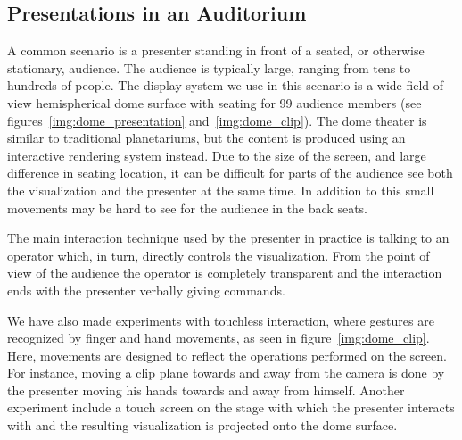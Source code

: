 \documentclass[review,journal]{vgtc}         %
\begin{document}
\subsection{Presentations in an Auditorium} \label{sec:largeaudience}
A common scenario is a presenter standing in front of a seated, or otherwise stationary, audience. 
The audience is typically large, ranging from tens to hundreds of people.
The display system we use in this scenario is a wide field-of-view hemispherical dome surface with seating for 99 audience members (see figures~\ref{img:dome_presentation} and~\ref{img:dome_clip}).
The dome theater is similar to traditional planetariums, but the content is produced using an interactive rendering system instead.
Due to the size of the screen, and large difference in seating location, it can be difficult for parts of the audience see both the visualization and the presenter at the same time. 
In addition to this small movements may be hard to see for the audience in the back seats. 

The main interaction technique used by the presenter in practice is talking to an operator which, in turn, directly controls the visualization.
From the point of view of the audience the operator is completely transparent and the interaction ends with the presenter verbally giving commands.

We have also made experiments with touchless interaction, where gestures are recognized by finger and hand movements, as seen in figure~\ref{img:dome_clip}.
Here, movements are designed to reflect the operations performed on the screen.
For instance, moving a clip plane towards and away from the camera is done by the presenter moving his hands towards and away from himself. 
Another experiment include a touch screen on the stage with which the presenter interacts with and the resulting visualization is projected onto the dome surface. 

\end{document}
